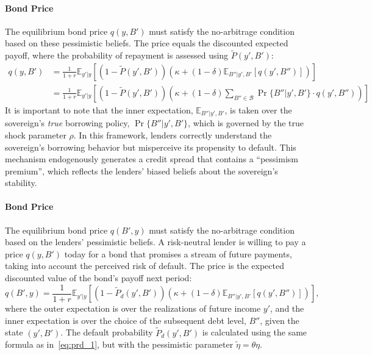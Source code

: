 \documentclass[12pt]{article}
\theoremstyle{plain}
\begin{document}
\paragraph{Bond Price}The equilibrium bond price $q(y, B')$ must satisfy the no-arbitrage condition
based on these pessimistic beliefs. The price equals the discounted expected
payoff, where the probability of repayment is assessed using $\tilde{P}(y',
	B')$:
\begin{equation}
	\begin{aligned}
		q(y, B') & = \frac{1}{1+r} \mathbb{E}_{y'|y} \left[ \left(1 - \tilde{P}(y', B') \right) \left( \kappa + (1-\delta) \mathbb{E}_{B''|y',B'} \left[ q(y', B'') \right] \right) \right]            \\
		         & = \frac{1}{1+r} \mathbb{E}_{y'|y} \left[ \left(1 - \tilde{P}(y', B') \right) \left( \kappa + (1-\delta)\sum_{B'' \in \mathcal{B}} \Pr\{B''|y', B'\}\cdot q(y', B'') \right) \right]
	\end{aligned}
	\label{eq:qprice_biased}
\end{equation}
It is important to note that the inner expectation, $\mathbb{E}_{B''|y',B'}$, is taken over the sovereign's \textit{true} borrowing policy, $\Pr\{B''|y', B'\}$, which is governed by the true shock parameter $\rho$. In this framework, lenders correctly understand the sovereign's borrowing behavior but misperceive its propensity to default. This mechanism endogenously generates a credit spread that contains a ``pessimism premium'', which reflects the lenders' biased beliefs about the sovereign's stability.

\paragraph{Bond Price}
The equilibrium bond price $q(B', y)$ must satisfy the no-arbitrage condition
based on the lenders' pessimistic beliefs. A risk-neutral lender is willing to
pay a price $q(y, B')$ today for a bond that promises a stream of future
payments, taking into account the perceived risk of default. The price is the
expected discounted value of the bond's payoff next period:
\begin{equation}
	q(B', y) = \frac{1}{1+r} \mathbb{E}_{y'|y} \left[ (1 - \tilde{P}_d(y', B')) \left( \kappa + (1-\delta) \mathbb{E}_{B''|y',B'} \left[ q(y', B'') \right] \right) \right],
	\label{eq:q_pessimism}
\end{equation}
where the outer expectation is over the realizations of future income $y'$, and
the inner expectation is over the choice of the subsequent debt level, $B''$,
given the state $(y', B')$. The default probability $\tilde{P}_d(y', B')$ is
calculated using the same formula as in~\eqref{eq:prd_1}, but with the
pessimistic parameter $\tilde{\eta} = \theta\eta$.
\end{document}
